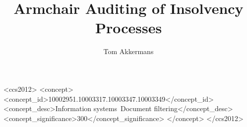 \documentclass[sigconf]{acmart}
\title{Armchair Auditing of Insolvency Processes}
\author{Tom Akkermans}
\affiliation{\institution{University of Amsterdam}}
\begin{document}



%
%
\begin{CCSXML}
<ccs2012>
	<concept>
		<concept_id>10002951.10003317.10003347.10003349</concept_id>
		<concept_desc>Information systems~Document filtering</concept_desc>
		<concept_significance>300</concept_significance>
	</concept>
</ccs2012>
\end{CCSXML}


\maketitle 





  
\end{document}
